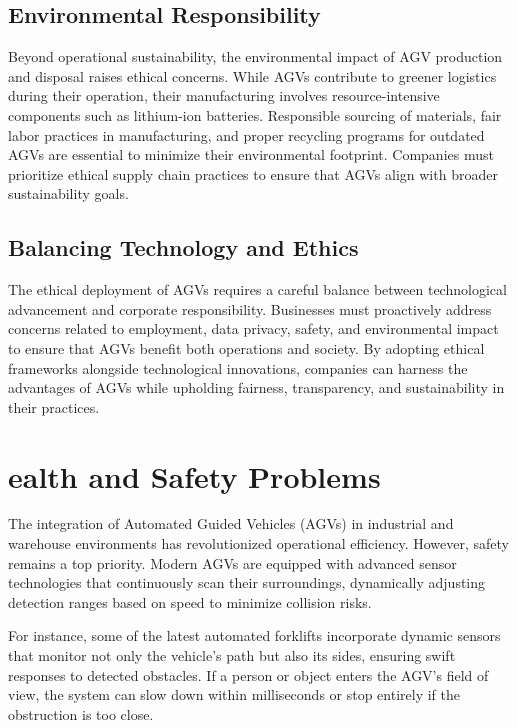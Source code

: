 \documentclass[../../main]{subfiles}
\begin{document}
\subsection{Environmental Responsibility}

Beyond operational sustainability, 
the environmental impact of AGV production and disposal 
raises ethical concerns. 
While AGVs contribute to greener logistics during their operation, 
their manufacturing involves resource-intensive components 
such as lithium-ion batteries. 
Responsible sourcing of materials, 
fair labor practices in manufacturing, 
and proper recycling programs for outdated AGVs 
are essential to minimize their environmental footprint. 
Companies must prioritize ethical supply chain practices 
to ensure that AGVs align with broader sustainability goals.

\subsection{Balancing Technology and Ethics}

The ethical deployment of AGVs requires a careful balance 
between technological advancement and corporate responsibility. 
Businesses must proactively address concerns 
related to employment, data privacy, safety, 
and environmental impact 
to ensure that AGVs benefit both operations and society. 
By adopting ethical frameworks alongside technological innovations, 
companies can harness the advantages of AGVs 
while upholding fairness, transparency, 
and sustainability in their practices.


\section{ealth and Safety Problems}

The integration of Automated Guided Vehicles (AGVs) in 
industrial and warehouse environments has revolutionized 
operational efficiency. However, safety remains a top 
priority. Modern AGVs are equipped with advanced sensor 
technologies that continuously scan their surroundings, 
dynamically adjusting detection ranges based on speed to 
minimize collision risks.

For instance, some of the latest automated forklifts 
incorporate dynamic sensors that monitor not only the 
vehicle’s path but also its sides, ensuring swift responses 
to detected obstacles. If a person or object enters the 
AGV’s field of view, the system can slow down within 
milliseconds or stop entirely if the obstruction is too close.
\end{document}
